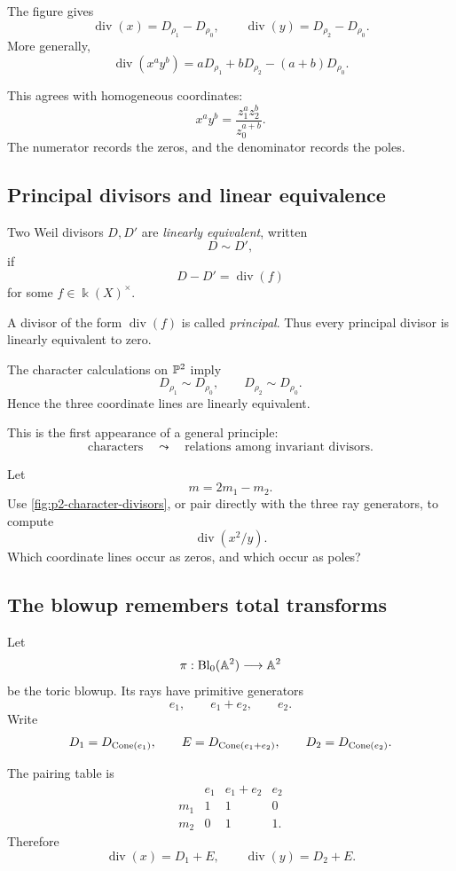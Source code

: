 The figure gives
\[
\operatorname{div}(x)
=
D_{\rho_1}-D_{\rho_0},
\qquad
\operatorname{div}(y)
=
D_{\rho_2}-D_{\rho_0}.
\]
More generally,
\[
\operatorname{div}(x^ay^b)
=
aD_{\rho_1}
+
bD_{\rho_2}
-
(a+b)D_{\rho_0}.
\]

This agrees with homogeneous coordinates:
\[
x^ay^b
=
\frac{z_1^az_2^b}{z_0^{a+b}}.
\]
The numerator records the zeros, and the denominator records the
poles.

\subsection{Principal divisors and linear equivalence}

\begin{definition}
Two Weil divisors \(D,D'\) are \emph{linearly equivalent}, written
\[
D\sim D',
\]
if
\[
D-D'=\operatorname{div}(f)
\]
for some \(f\in\Bbbk(X)^\times\).

A divisor of the form \(\operatorname{div}(f)\) is called
\emph{principal}. Thus every principal divisor is linearly equivalent
to zero.
\end{definition}

The character calculations on \(\PP^2\) imply
\[
D_{\rho_1}\sim D_{\rho_0},
\qquad
D_{\rho_2}\sim D_{\rho_0}.
\]
Hence the three coordinate lines are linearly equivalent.

This is the first appearance of a general principle:
\[
\text{characters}
\quad\leadsto\quad
\text{relations among invariant divisors}.
\]

\begin{pauseandthink}
Let
\[
m=2m_1-m_2.
\]
Use \cref{fig:p2-character-divisors}, or pair directly with the three
ray generators, to compute
\[
\operatorname{div}(x^2/y).
\]
Which coordinate lines occur as zeros, and which occur as poles?
\end{pauseandthink}

\subsection{The blowup remembers total transforms}

Let
\[
\pi:\Blp{\AAA^2}{0}\longrightarrow\AAA^2
\]
be the toric blowup. Its rays have primitive generators
\[
e_1,\qquad
e_1+e_2,\qquad
e_2.
\]
Write
\[
D_1=D_{\Cone{e_1}},
\qquad
E=D_{\Cone{e_1+e_2}},
\qquad
D_2=D_{\Cone{e_2}}.
\]

The pairing table is
\[
\begin{array}{c|ccc}
&
e_1
&
e_1+e_2
&
e_2
\\
\hline
m_1
&
1&1&0
\\
m_2
&
0&1&1.
\end{array}
\]
Therefore
\[
\operatorname{div}(x)
=
D_1+E,
\qquad
\operatorname{div}(y)
=
D_2+E.
\]

